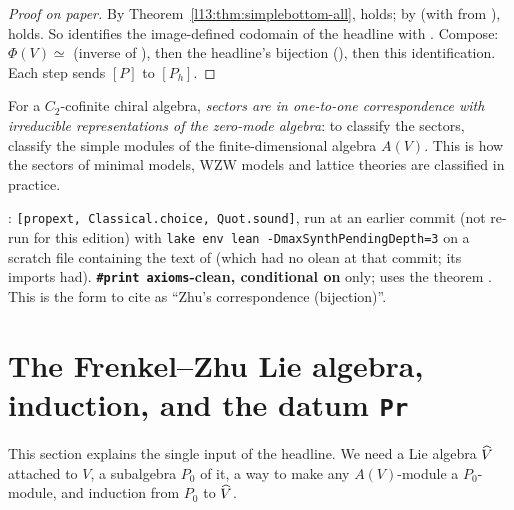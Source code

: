 \begin{proof}[Proof on paper]
By Theorem~\ref{l13:thm:simplebottom-all},  holds; by  (with
 from ),  holds. So  identifies the
image-defined codomain  of the headline with . Compose: $\Phi(V)\simeq$
 (inverse of ), then the headline's bijection
 (), then this identification. Each step sends $[P]$ to $[P_h]$.
\end{proof}

\begin{physics}
For a $C_2$-cofinite chiral algebra, \emph{sectors are in one-to-one correspondence with irreducible representations of the
zero-mode algebra}: to classify the sectors, classify the simple modules of the finite-dimensional algebra $A(V)$. This is how
the sectors of minimal models, WZW models and lattice theories are classified in practice.
\end{physics}

\begin{status}
: \texttt{[propext, Classical.choice, Quot.sound]}, run at an earlier commit (not re-run for this edition) with
\texttt{lake env lean -DmaxSynthPendingDepth=3} on a scratch file containing the text of
 (which had no olean at that commit; its imports had). \textbf{\texttt{\#print
axioms}-clean, conditional on}  only; uses the theorem . This is the form to cite as ``Zhu's
correspondence (bijection)''.
\end{status}

\section{The Frenkel--Zhu Lie algebra, induction, and the datum \texttt{Pr}}\label{l13:sec:vhat}

This section explains the single input of the headline. We need a Lie algebra $\widehat{V}$ attached to $V$, a
subalgebra $P_0$ of it, a way to make any $A(V)$-module a $P_0$-module, and induction from $P_0$ to $\widehat{V}$.

